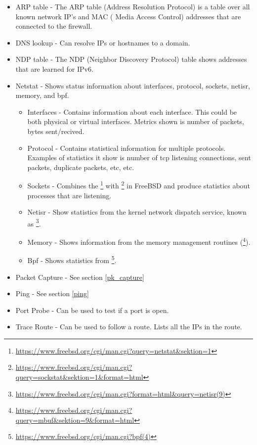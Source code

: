 \begin{itemize}
    \item ARP table - The ARP table (Address Resolution Protocol) is a table over all known network IP's and MAC ( Media Access Control) addresses that are connected to the firewall.
    \item DNS lookup - Can resolve IPs or hostnames to a domain.
    \item NDP table - The NDP (Neighbor Discovery Protocol) table shows addresses that are learned for IPv6.
    \item Netstat - Shows status information about interfaces, protocol, sockets, netisr, memory, and bpf.
    \begin{itemize}
        \item Interfaces - Contains information about each interface. This could be both physical or virtual interfaces. Metrics shown is number of packets, bytes sent/recived.
        \item Protocol - Contains statistical information for multiple protocols. Examples of statistics it show is number of tcp listening connections, sent packets, duplicate packets, etc, etc.
        \item Sockets - Combines the \footnote{\url{https://www.freebsd.org/cgi/man.cgi?query=netstat&sektion=1}} with \footnote{\url{https://www.freebsd.org/cgi/man.cgi?query=sockstat&sektion=1&format=html}} in FreeBSD and produce statistics about processes that are listening.
        \item Netisr - Show statistics from the kernel network dispatch service, known as \footnote{\url{https://www.freebsd.org/cgi/man.cgi?format=html&query=netisr(9)}}.
        \item Memory - Shows information from the memory management routines (\footnote{\url{https://www.freebsd.org/cgi/man.cgi?query=mbuf&sektion=9&format=html}}).
        \item Bpf - Shows statistics from \footnote{\url{https://www.freebsd.org/cgi/man.cgi?bpf(4)}}.
    \end{itemize}
    \item Packet Capture - See section \ref{pk_capture}
    \item Ping - See section \ref{ping}
    \item Port Probe - Can be used to test if a port is open.
    \item Trace Route - Can be used to follow a route. Lists all the IPs in the route.
\end{itemize}

